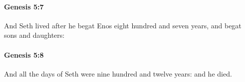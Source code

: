 		\paragraph{Genesis 5:7} %
			\label{GENESIS-5-7}

			And Seth lived after he begat Enos eight hundred and seven years, and begat sons and daughters:


		\paragraph{Genesis 5:8} %
			\label{GENESIS-5-8}

			And all the days of Seth were nine hundred and twelve years: and he died.


